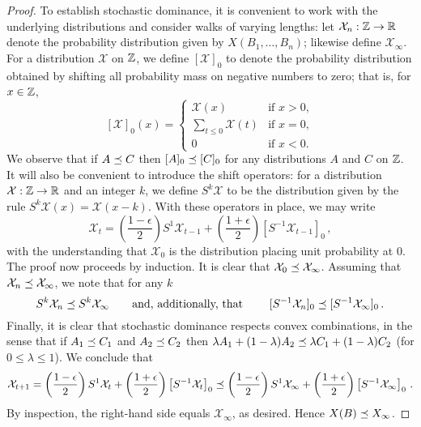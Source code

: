 \begin{proof}
    To establish stochastic dominance, it is convenient to work with the
    underlying distributions and consider walks of varying lengths: let
    $\mathcal{X}_n: \mathbb{Z} \rightarrow \mathbb{R}$ denote the probability distribution given by
    $X(B_1, \ldots, B_n)$; likewise
    define $\mathcal{X}_\infty$. For a distribution $\mathcal{X}$ on $\mathbb{Z}$, we define $[\mathcal{X}]_0$
    to denote the probability distribution obtained by shifting all
    probability mass on negative numbers to zero; that is, for $x \in \mathbb{Z}$,
    \[
      [\mathcal{X}]_0(x) = \begin{cases} \mathcal{X}(x) & \text{if $x > 0$},\\
        \sum_{t \leq 0} \mathcal{X}(t) & \text{if $x = 0$},\\
        0 & \text{if $x < 0$.}
      \end{cases}
    \]
    We observe that if $A \preceq C$ then $[A]_0 \preceq [C]_0$ for any
    distributions $A$ and $C$ on $\mathbb{Z}$. It will also be convenient to
    introduce the shift operators: for a distribution
    $\mathcal{X}: \mathbb{Z} \rightarrow \mathbb{R}$ and an integer $k$, we define $S^k\mathcal{X}$ to be the
    distribution given by the rule $S^k\mathcal{X}(x) = \mathcal{X}(x-k)$. With these
    operators in place, we may write
    \[
      \mathcal{X}_t = \left(\frac{1 - \epsilon}{2}\right) S^1 \mathcal{X}_{t-1} +
        \left(\frac{1 + \epsilon}{2}\right) \left[S^{-1}\mathcal{X}_{t-1} \right]_0\,,
    \]
    with the understanding that $\mathcal{X}_0$ is the distribution placing unit probability at $0$. The proof now proceeds by induction. It is clear that $\mathcal{X}_0 \preceq \mathcal{X}_\infty$. Assuming that $\mathcal{X}_n \preceq \mathcal{X}_\infty$, we note that for any $k$
    \[
      S^k \mathcal{X}_n \preceq S^k \mathcal{X}_\infty \qquad \text{and, additionally, that
      }\qquad [S^{-1}\mathcal{X}_n]_0 \preceq [S^{-1}\mathcal{X}_{\infty}]_0\,.
    \]
    Finally, it is clear that stochastic dominance respects convex combinations, 
    in the sense that if $A_1 \preceq C_1$ and $A_2 \preceq C_2$ then 
    $\lambda A_1 + (1-\lambda) A_2 \preceq \lambda C_1 + (1-\lambda) C_2$ (for $0 \leq \lambda \leq 1$). We conclude that
    \[
      \mathcal{X}_{t+1} = \left(\frac{1 - \epsilon}{2}\right) S^1 \mathcal{X}_{t} +
        \left(\frac{1 + \epsilon}{2}\right) \left[S^{-1}\mathcal{X}_{t} \right]_0 \preceq \left(\frac{1 - \epsilon}{2}\right) S^1 \mathcal{X}_{\infty} +
        \left(\frac{1 + \epsilon}{2}\right) \left[S^{-1}\mathcal{X}_{\infty} \right]_0 
        \,.
    \]
    By inspection, the right-hand side equals $\mathcal{X}_{\infty}$, as desired. 
    Hence $X(B) \preceq X_\infty$.
  \end{proof}
